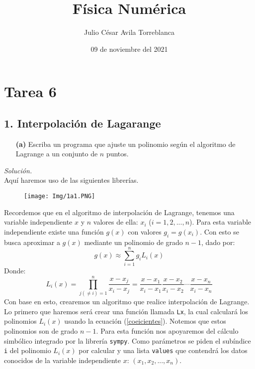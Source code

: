 \documentclass[11pt]{article}
\title{Física Numérica}
\author{Julio César Avila Torreblanca}
\date{09 de noviembre del 2021}
\begin{document}
	\maketitle
	
\section*{Tarea 6}
\subsection*{\textbf{1. Interpolación de Lagarange}}
	\begin{enumerate}
		\item [\textbf{(a)}]Escriba un programa que ajuste un polinomio según el algoritmo de Lagrange a un conjunto de $n$ puntos.
	\end{enumerate}
	\textit{Solución.}\\
		Aquí haremos uso de las siguientes librerías.
		\begin{figure}[h]
			\centering
			\texttt{[image: Img/1a1.PNG]}
		\end{figure}
		Recordemos que en el algoritmo de interpolación de Lagrange, tenemos una variable independiente $x$ y $n$ valores de ella: $x_i$ ($i=1,2,...,n$). Para esta variable independiente existe una función $g(x)$ con valores $g_i = g(x_i)$. Con esto se busca aproximar a $g(x)$ mediante un polinomio de grado $n-1$, dado por:
		\begin{equation}\label{Pol Lagrange}
			g(x) \approx \sum_{i=1}^{n} g_i L_i(x)		
		\end{equation}
		Donde:
		\begin{equation} \label{coeicientes}
			L_i(x) = \prod_{j(\neq i)=1}^{n} \frac{x-x_j}{x_i - x_j} = \frac{x-x_1}{x_i -x_1} \frac{x-x_2}{x_i -x_2} \cdots \frac{x-x_n}{x_i -x_n} 
		\end{equation}
		Con base en esto, crearemos un algoritmo que realice interpolación de Lagrange.\\
		
		Lo primero que haremos será crear una función llamada \texttt{Lx}, la cual calculará los polinomios $L_i(x)$ usando la ecuación (\ref{coeicientes}). Notemos que estos polinomios son de grado $n-1$. Para esta función nos apoyaremos del cálculo simbólico integrado por la librería \texttt{sympy}. Como parámetros se piden el subíndice \texttt{i} del polinomio $L_i(x)$ por calcular y una lista \texttt{values} que contendrá los datos conocidos de la variable independiente $x$: $(x_1,x_2,..., x_n)$.
		
\end{document}
